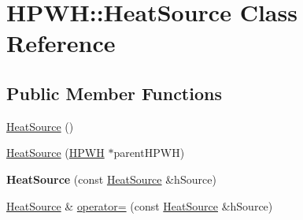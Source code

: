 \hypertarget{class_h_p_w_h_1_1_heat_source}{\section{H\-P\-W\-H\-:\-:Heat\-Source Class Reference}
\label{class_h_p_w_h_1_1_heat_source}
}
\subsection*{Public Member Functions}
\begin{DoxyCompactItemize}
\item 
\hyperlink{class_h_p_w_h_1_1_heat_source_a819acb0758c47e8fea22fb549e6b9ef1}{Heat\-Source} ()
\item 
\hyperlink{class_h_p_w_h_1_1_heat_source_a6b2b891c698174c8ed85f10f7b935cd4}{Heat\-Source} (\hyperlink{class_h_p_w_h}{H\-P\-W\-H} $\ast$parent\-H\-P\-W\-H)
\item 
\hypertarget{class_h_p_w_h_1_1_heat_source_a49a0d217365e1fbbf4865a9c8dc1f658}{{\bfseries Heat\-Source} (const \hyperlink{class_h_p_w_h_1_1_heat_source}{Heat\-Source} \&h\-Source)}\label{class_h_p_w_h_1_1_heat_source_a49a0d217365e1fbbf4865a9c8dc1f658}

\item 
\hypertarget{class_h_p_w_h_1_1_heat_source_a4882ea32f0fca3b0b3f2f739f0ad4f9e}{\hyperlink{class_h_p_w_h_1_1_heat_source}{Heat\-Source} \& \hyperlink{class_h_p_w_h_1_1_heat_source_a4882ea32f0fca3b0b3f2f739f0ad4f9e}{operator=} (const \hyperlink{class_h_p_w_h_1_1_heat_source}{Heat\-Source} \&h\-Source)}\label{class_h_p_w_h_1_1_heat_source_a4882ea32f0fca3b0b3f2f739f0ad4f9e}


\end{DoxyCompactItemize}

